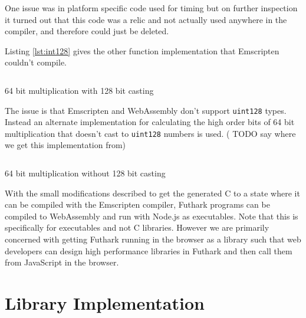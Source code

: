 \documentclass[11pt]{book}
\begin{document}
One issue was in platform specific code used for timing but on further inspection it turned out that this code was a relic and not actually used anywhere in the compiler, and therefore could just be deleted.

Listing \ref{lst:int128} gives the other function implementation that Emscripten couldn't compile.
\begin{listing}[h] 
        \inputminted[fontsize=\small,baselinestretch=0.5,linenos]{C}{code/compiler/int128_c.c}
        \caption{64 bit multiplication with 128 bit casting}
        \label{lst:int128}    
\end{listing} 

The issue is that Emscripten and WebAssembly don't support \texttt{uint128} types. Instead an alternate implementation for calculating the high order bits of 64 bit multiplication that doesn't cast to \texttt{uint128} numbers is used. ({\color{red} TODO} say where we get this implementation from)

\begin{listing}[H] 
        \inputminted[fontsize=\small,baselinestretch=0.5,linenos]{C}{code/compiler/int128_wasm.c}
        \caption{64 bit multiplication without 128 bit casting}
        \label{lst:integrate-js}    
\end{listing} 


With the small modifications described to get the generated C to a state where it can be compiled with the Emscripten compiler, Futhark programs can be compiled to WebAssembly and run with Node.js as executables. Note that this is specifically for executables and not C libraries. However we are primarily concerned with getting Futhark running in the browser as a library such that web developers can design high performance libraries in Futhark and then call them from JavaScript in the browser. 


\section{Library Implementation}
\end{document}
